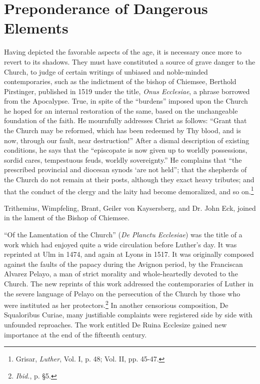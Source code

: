 \section{Preponderance of Dangerous Elements}

Having depicted the favorable aspects of the age, it is necessary
once more to revert to its shadows. They must have constituted a
source of grave danger to the Church, to judge of certain writings
of unbiased and noble-minded contemporaries, such as the indictment of
the bishop of Chiemsee, Berthold Pirstinger, published in
1519 under the title, \textit{Onus Ecclesiae}, a phrase borrowed from the
Apocalypse. True, in spite of the “burdens” imposed upon the Church
he hoped for an internal restoration of the same, based on the unchangeable
foundation of the faith. He mournfully addresses Christ
as follows: “Grant that the Church may be reformed, which has
been redeemed by Thy blood, and is now, through our fault, near
destruction!” After a dismal description of existing conditions, he
says that the “episcopate is now given up to worldly possessions,
sordid cares, tempestuous feuds, worldly sovereignty.” He complains
that “the prescribed provincial and diocesan synods ‘are not held”;
that the shepherds of the Church do not remain at their posts, although
they exact heavy tributes; and that the conduct of the clergy
and the laity had become demoralized, and so on.\footnote
{Grisar, \textit{Luther}, Vol. I, p. 48; Vol. II, pp. 45-47.}

Trithemius, Wimpfeling, Brant, Geiler von Kaysersberg, and Dr.
John Eck, joined in the lament of the Bishop of Chiemsee.

“Of the Lamentation of the Church” (\textit{De Planctu Ecclesiae})
was the title of a work which had enjoyed quite a wide circulation
before Luther’s day. It was reprinted at Ulm in 1474, and again at
Lyons in 1517. It was originally composed against the faults of
the papacy during the Avignon period, by the Franciscan Alvarez
Pelayo, a man of strict morality and whole-heartedly devoted to the
Church. The new reprints of this work addressed the contemporaries
of Luther in the severe language of Pelayo on the persecution of
the Church by those who were instituted as her protectors.\footnote{\textit{Ibid.}, p. §5.}
In another censorious composition, De Squaloribus Curiae, many justifiable
complaints were registered side by side with unfounded reproaches. The
work entitled De Ruina Ecclesize gained new importance
at the end of the fifteenth century.

